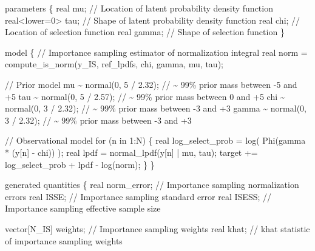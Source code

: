 \documentclass[
  letterpaper,
  DIV=11,
  numbers=noendperiod]{scrartcl}
\newenvironment{Shaded}{\begin{snugshade}}{\end{snugshade}}
\newcommand{\CommentTok}[1]{\textcolor[rgb]{0.37,0.37,0.37}{#1}}
\newcommand{\ControlFlowTok}[1]{\textcolor[rgb]{0.00,0.23,0.31}{#1}}
\newcommand{\DataTypeTok}[1]{\textcolor[rgb]{0.68,0.00,0.00}{#1}}
\newcommand{\DecValTok}[1]{\textcolor[rgb]{0.68,0.00,0.00}{#1}}
\newcommand{\FloatTok}[1]{\textcolor[rgb]{0.68,0.00,0.00}{#1}}
\newcommand{\KeywordTok}[1]{\textcolor[rgb]{0.00,0.23,0.31}{#1}}
\newcommand{\NormalTok}[1]{\textcolor[rgb]{0.00,0.23,0.31}{#1}}
\begin{document}
\begin{codelisting}
\begin{Shaded}
\begin{Highlighting}[]
\KeywordTok{parameters}\NormalTok{ \{}
  \DataTypeTok{real}\NormalTok{ mu;           }\CommentTok{// Location of latent probability density function}
  \DataTypeTok{real}\NormalTok{\textless{}}\KeywordTok{lower}\NormalTok{=}\DecValTok{0}\NormalTok{\textgreater{} tau; }\CommentTok{// Shape of latent probability density function}
  \DataTypeTok{real}\NormalTok{ chi;   }\CommentTok{// Location of selection function}
  \DataTypeTok{real}\NormalTok{ gamma; }\CommentTok{// Shape of selection function}
\NormalTok{\}}

\KeywordTok{model}\NormalTok{ \{}
  \CommentTok{// Importance sampling estimator of normalization integral}
  \DataTypeTok{real}\NormalTok{ norm = compute\_is\_norm(y\_IS, ref\_lpdfs, chi, gamma, mu, tau);}
  
  \CommentTok{// Prior model}
\NormalTok{  mu \textasciitilde{} normal(}\DecValTok{0}\NormalTok{, }\DecValTok{5}\NormalTok{ / }\FloatTok{2.32}\NormalTok{);   }\CommentTok{// \textasciitilde{} 99\% prior mass between {-}5 and +5}
\NormalTok{  tau \textasciitilde{} normal(}\DecValTok{0}\NormalTok{, }\DecValTok{5}\NormalTok{ / }\FloatTok{2.57}\NormalTok{);  }\CommentTok{// \textasciitilde{} 99\% prior mass between 0 and +5}
\NormalTok{  chi \textasciitilde{} normal(}\DecValTok{0}\NormalTok{, }\DecValTok{3}\NormalTok{ / }\FloatTok{2.32}\NormalTok{);   }\CommentTok{// \textasciitilde{} 99\% prior mass between {-}3 and +3}
\NormalTok{  gamma \textasciitilde{} normal(}\DecValTok{0}\NormalTok{, }\DecValTok{3}\NormalTok{ / }\FloatTok{2.32}\NormalTok{); }\CommentTok{// \textasciitilde{} 99\% prior mass between {-}3 and +3}
  
  \CommentTok{// Observational model}
  \ControlFlowTok{for}\NormalTok{ (n }\ControlFlowTok{in} \DecValTok{1}\NormalTok{:N) \{}
    \DataTypeTok{real}\NormalTok{ log\_select\_prob = log( Phi(gamma * (y[n] {-} chi)) );}
    \DataTypeTok{real}\NormalTok{ lpdf = normal\_lpdf(y[n] | mu, tau);}
    \KeywordTok{target +=}\NormalTok{ log\_select\_prob + lpdf {-} log(norm);}
\NormalTok{  \}}
\NormalTok{\}}

\KeywordTok{generated quantities}\NormalTok{ \{}
  \DataTypeTok{real}\NormalTok{ norm\_error; }\CommentTok{// Importance sampling normalization errors}
  \DataTypeTok{real}\NormalTok{ ISSE;       }\CommentTok{// Importance sampling standard error}
  \DataTypeTok{real}\NormalTok{ ISESS;      }\CommentTok{// Importance sampling effective sample size}

  \DataTypeTok{vector}\NormalTok{[N\_IS] weights; }\CommentTok{// Importance sampling weights}
  \DataTypeTok{real}\NormalTok{ khat;            }\CommentTok{// khat statistic of importance sampling weights}
  

\end{Highlighting}
\end{Shaded}
\end{codelisting}
\end{document}
